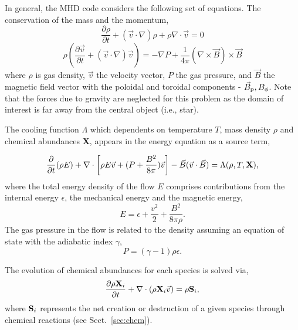 \documentclass[useAMS,usenatbib,letters]{mn2e}
\begin{document}
  
In general, the MHD code considers the following set of equations.
The conservation of the mass and the momentum,
%
\begin{equation}\label{masscons}
\frac{\partial \rho}{\partial t} + (\vec{v} \cdot \nabla)\rho  +
\rho \nabla \cdot \vec{v} = 0
\end{equation}
%
\begin{equation}\label{momcons}
\rho(\frac{\partial \vec{v}}{\partial t} +
(\vec{v} \cdot \nabla) \vec{v}) =
- \nabla P + \frac{1}{4\pi} (\nabla \times \vec{B}) \times \vec{B}
\end{equation}
%
where $\rho$ is gas density, $\vec{v}$ the velocity vector, $P$ the gas pressure,
and $\vec{B}$ the magnetic field vector with the poloidal and toroidal
components - $\vec{B}_{\rm p}, {B}_{\phi}$. Note that the forces due
to gravity are neglected for this problem as the domain of interest is
far away from the central object (i.e., star).  
%

The cooling function $\Lambda$ which dependents on temperature $T$, mass density $\rho$ and
chemical abundances {\bf{X}}, appears in the
energy equation as a source term,

\begin{equation}\label{encons1}
\frac{\partial}{\partial t}(\rho E)
+ \nabla \cdot\left[ \rho E \vec{v} + (P + \frac{B^2}{8\pi})\vec{v}\right]  
- \vec{B}(\vec{v}\cdot\vec{B}) = \Lambda(\rho,T,{\bf{X}}),
\end{equation}
%
%
where the total energy density of the flow $E$ comprises contributions from 
the internal energy $\epsilon$, the mechanical energy and the magnetic energy,
%
\begin{equation}\label{encons2}
 E = \epsilon + \frac{v^2}{2} + \frac{B^2}{8 \pi \rho}.
\end{equation}
The gas pressure in the flow is related to the density assuming an equation 
of state with the adiabatic index $\gamma$,
%
\begin{equation}\label{EOS}
P = (\gamma - 1) \rho \epsilon.
\end{equation}

The evolution of chemical abundances for each species is solved via,
%
\begin{equation}\label{chemevol}
\frac{\partial \rho{\bf{X}}_{i}}{\partial t} + \nabla \cdot (\rho
{\bf{X}}_{i} \vec{v})  = \rho {\bf{S}}_{i},
\end{equation}
where ${\bf{S}}_{i}$ represents the net creation or destruction of a
given species through chemical reactions (see Sect.~\ref{sec:chem}).
\end{document}

